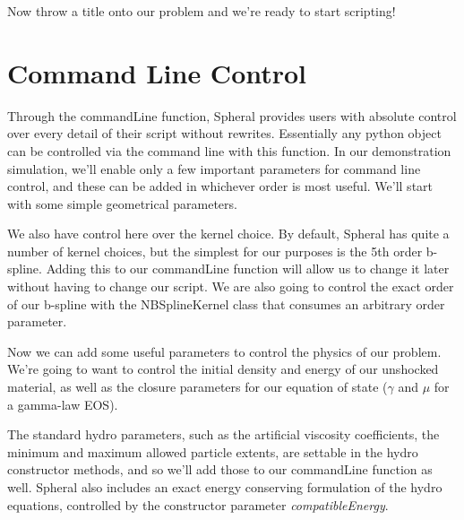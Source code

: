 \documentclass[11pt]{memoir}
\begin{document}


Now throw a title onto our problem and we're ready to start scripting!



\section{Command Line Control}

Through the commandLine function, Spheral provides users with absolute control over every detail of their script without rewrites. Essentially any python object can be controlled via the command line with this function. In our demonstration simulation, we'll enable only a few important parameters for command line control, and these can be added in whichever order is most useful. We'll start with some simple geometrical parameters.



We also have control here over the kernel choice. By default, Spheral has quite a number of kernel choices, but the simplest for our purposes is the 5th order b-spline. Adding this to our commandLine function will allow us to change it later without having to change our script. We are also going to control the exact order of our b-spline with the NBSplineKernel class that consumes an arbitrary order parameter.



Now we can add some useful parameters to control the physics of our problem. We're going to want to control the initial density and energy of our unshocked material, as well as the closure parameters for our equation of state ($\gamma$ and $\mu$ for a gamma-law EOS).



The standard hydro parameters, such as the artificial viscosity coefficients, the minimum and maximum allowed particle extents, are settable in the hydro constructor methods, and so we'll add those to our commandLine function as well. Spheral also includes an exact energy conserving formulation of the hydro equations, controlled by the constructor parameter \textit{compatibleEnergy}.
\end{document}
